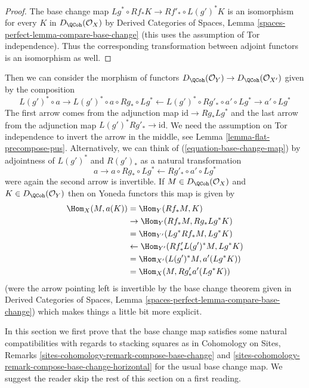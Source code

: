 \begin{proof}
The base change map $Lg^* \circ Rf_* K \to Rf'_* \circ L(g')^*K$
is an isomorphism for every $K$ in $D_\QCoh(\mathcal{O}_X)$ by
Derived Categories of Spaces, Lemma
\ref{spaces-perfect-lemma-compare-base-change}
(this uses the assumption of Tor independence).
Thus the corresponding transformation between adjoint functors
is an isomorphism as well.
\end{proof}

\noindent
Then we can consider the
morphism of functors
$D_\QCoh(\mathcal{O}_Y) \to D_\QCoh(\mathcal{O}_{X'})$
given by the composition
\begin{equation}
\label{equation-base-change-map}
L(g')^* \circ a \to
L(g')^* \circ a \circ Rg_* \circ Lg^* \leftarrow
L(g')^* \circ Rg'_* \circ a' \circ Lg^* \to a' \circ Lg^*
\end{equation}
The first arrow comes from the adjunction map $\text{id} \to Rg_* Lg^*$
and the last arrow from the adjunction map $L(g')^*Rg'_* \to \text{id}$.
We need the assumption on Tor independence to invert the arrow
in the middle, see Lemma \ref{lemma-flat-precompose-pus}.
Alternatively, we can think of (\ref{equation-base-change-map}) by
adjointness of $L(g')^*$ and $R(g')_*$ as a natural transformation
$$
a \to a \circ Rg_* \circ Lg^* \leftarrow Rg'_* \circ a' \circ Lg^*
$$
were again the second arrow is invertible. If $M \in D_\QCoh(\mathcal{O}_X)$
and $K \in D_\QCoh(\mathcal{O}_Y)$
then on Yoneda functors this map is given by
\begin{align*}
\Hom_X(M, a(K))
& =
\Hom_Y(Rf_*M, K) \\
& \to
\Hom_Y(Rf_*M, Rg_* Lg^*K) \\
& =
\Hom_{Y'}(Lg^*Rf_*M, Lg^*K) \\
& \leftarrow
\Hom_{Y'}(Rf'_* L(g')^*M, Lg^*K) \\
& =
\Hom_{X'}(L(g')^*M, a'(Lg^*K)) \\
& =
\Hom_X(M, Rg'_*a'(Lg^*K))
\end{align*}
(were the arrow pointing left is invertible by the base
change theorem given in
Derived Categories of Spaces, Lemma
\ref{spaces-perfect-lemma-compare-base-change})
which makes things a little bit more explicit.

\medskip\noindent
In this section we first prove that the base change map satisfies
some natural compatibilities with regards to stacking squares as in
Cohomology on Sites, Remarks
\ref{sites-cohomology-remark-compose-base-change} and
\ref{sites-cohomology-remark-compose-base-change-horizontal}
for the usual base change map.
We suggest the reader skip the rest of this section on a first reading.

